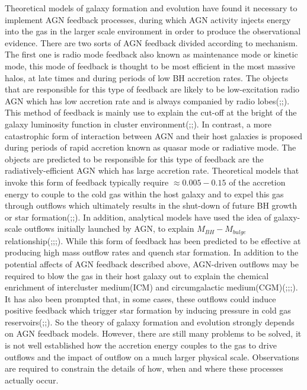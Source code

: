 \documentclass[../main.tex]{subfiles}
\begin{document}
Theoretical models of galaxy formation and evolution have found it necessary to implement AGN feedback processes, during which AGN activity injects energy into the gas in the larger scale environment in order to produce the observational evidence. There are two sorts of AGN feedback divided according to mechanism. The first one is radio mode feedback also known as maintenance mode or kinetic mode, this mode of feedback is thought to be most efficient in the most massive halos, at late times and during periods of low BH accretion rates. The objects that are responsible for this type of feedback are likely to be low-excitation radio AGN which has low accretion rate and is always companied by radio lobes(\cite{churazov2005supermassive};\cite{bower2006breaking};\cite{mccarthy2011gas}). This method of feedback is mainly use to explain the cut-off at the bright of the galaxy luminosity function in cluster environment(\cite{bower2006breaking};\cite{croton2006many};\cite{somerville2008semi}). In contrast, a more catastrophic form of interaction between AGN and their host galaxies is proposed during periods of rapid accretion known as quasar mode or radiative mode. The objects are predicted to be responsible for this type of feedback are the radiatively-efficient AGN which has large accretion rate. Theoretical models that invoke this form of feedback typically require $\approx 0.005-0.15$ of the accretion energy to couple to the cold gas within the host galaxy and to expel this gas through outflows which ultimately results in the shut-down of future BH growth or star formation(\cite{benson2003shapes};\cite{hopkins2006normalization};\cite{debuhr2012galaxy}). In addition, analytical models have used the idea of galaxy-scale outflows initially launched by AGN, to explain $M_{BH}-M_{bulge}$ relationship(\cite{fabian1999obscured};\cite{granato2004physical};\cite{king2011large};\cite{faucher2012physics}). While this form of feedback has been predicted to be effective at producing high mass outflow rates and quench star formation. In addition to the potential affects of AGN feedback described above, AGN-driven outflows may be required to blow the gas in their host galaxy out to explain the chemical enrichment of intercluster medium(ICM) and circumgalactic medium(CGM)(\cite{borgani2008chemical};\cite{wiersma2009chemical};\cite{fabjan2010simulating};\cite{ciotti2010feedback}). It has also been prompted that, in some cases, these outflows could induce positive feedback which trigger star formation by inducing pressure in cold gas reservoirs(\cite{nayakshin2012quasar};\cite{ishibashi2012active};\cite{silk2013unleashing}). So the theory of galaxy formation and evolution strongly depends on AGN feedback models. However, there are still many problems to be solved, it is not well established how the accretion energy couples to the gas to drive outflows and the impact of outflow on a much larger physical scale. Observations are required to constrain the details of how, when and where these processes actually occur.
\end{document}

